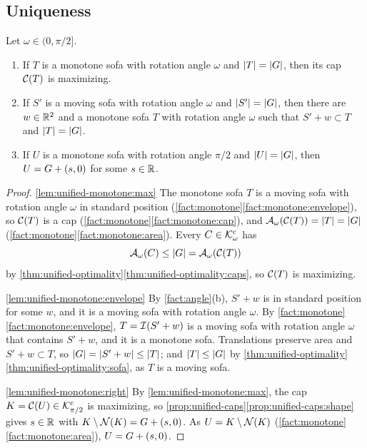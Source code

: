 \subsection{Uniqueness}\label{sec:unified-uniqueness}

\begin{lemma}\label{lem:unified-monotone}
Let $\omega\in(0,\pi/2]$.
\begin{enumerate}[label=(\alph*)]
\item\label{lem:unified-monotone:max} If $T$ is a monotone sofa with rotation
angle $\omega$ and $\lvert T\rvert=\lvert G\rvert$, then its cap $\mathcal{C}(T)$ is maximizing.
\item\label{lem:unified-monotone:envelope} If $S'$ is a moving sofa with
rotation angle $\omega$ and $\lvert S'\rvert=\lvert G\rvert$, then there are $w\in\mathbb{R}^2$ and a
monotone sofa $T$ with rotation angle $\omega$ such that $S'+w\subset T$ and
$\lvert T\rvert=\lvert G\rvert$.
\item\label{lem:unified-monotone:right} If $U$ is a monotone sofa with rotation
angle $\pi/2$ and $\lvert U\rvert=\lvert G\rvert$, then $U=G+(s,0)$ for some $s\in\mathbb{R}$.
\end{enumerate}
\end{lemma}

\begin{proof}
\ref{lem:unified-monotone:max} The monotone sofa $T$ is a moving sofa with
rotation angle $\omega$ in standard position
(\cref{fact:monotone}\ref{fact:monotone:envelope}), so $\mathcal{C}(T)$ is a cap
(\cref{fact:monotone}\ref{fact:monotone:cap}), and
$\mathcal{A}_\omega(\mathcal{C}(T))=\lvert T\rvert=\lvert G\rvert$
(\cref{fact:monotone}\ref{fact:monotone:area}). Every $C\in\mathcal{K}^{\mathrm{c}}_\omega$ has
\[
  \mathcal{A}_\omega(C)\le\lvert G\rvert=\mathcal{A}_\omega(\mathcal{C}(T))
\]
by \cref{thm:unified-optimality}\ref{thm:unified-optimality:caps}, so $\mathcal{C}(T)$
is maximizing.

\ref{lem:unified-monotone:envelope} By \cref{fact:angle}(b), $S'+w$ is in
standard position for some $w$, and it is a moving sofa with rotation angle
$\omega$. By \cref{fact:monotone}\ref{fact:monotone:envelope}, $T=\mathcal{I}(S'+w)$ is
a moving sofa with rotation angle $\omega$ that contains $S'+w$, and it is a
monotone sofa. Translations preserve area and $S'+w\subset T$, so
$\lvert G\rvert=\lvert S'+w\rvert\le\lvert T\rvert$; and $\lvert T\rvert\le\lvert G\rvert$ by
\cref{thm:unified-optimality}\ref{thm:unified-optimality:sofa}, as $T$ is a
moving sofa.

\ref{lem:unified-monotone:right} By \ref{lem:unified-monotone:max}, the cap
$K=\mathcal{C}(U)\in\mathcal{K}^{\mathrm{c}}_{\pi/2}$ is maximizing, so
\cref{prop:unified-caps}\ref{prop:unified-caps:shape} gives $s\in\mathbb{R}$ with
$K\setminus\mathcal{N}(K)=G+(s,0)$. As $U=K\setminus\mathcal{N}(K)$
(\cref{fact:monotone}\ref{fact:monotone:area}), $U=G+(s,0)$.
\end{proof}

